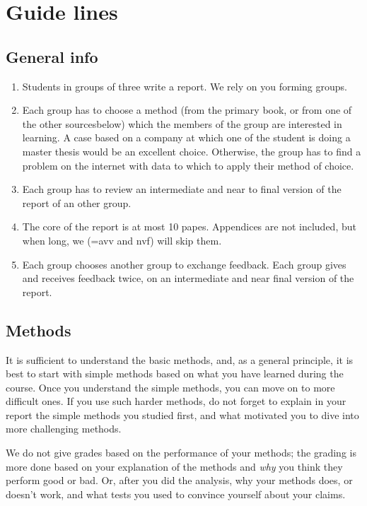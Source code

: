 \documentclass[report]{subfiles}
\begin{document}
\section*{Guide lines}
\label{sec:time-line}

\subsection*{General info}
\label{sec:general}


\begin{enumerate}
\item  Students in groups of three write a report. We rely on you forming groups.
\item Each group has to choose a method (from the primary book, or from one of the other sourcesbelow) which the members of the group are interested in learning. A case based on a company at which one of the student is doing a master thesis would be an excellent choice.
Otherwise, the group has to find a problem on the internet with data to which to apply their method of choice.
\item Each group has to review an intermediate and near to final version of the report of an other group.
\item The core of the report is at most 10 papes. Appendices are not included, but when long, we (=avv and nvf) will skip them.
\item Each group chooses another group to exchange feedback.
  Each group gives and receives feedback twice, on an intermediate and near final version of the report.
\end{enumerate}

\subsection{Methods}
\label{sec:methods}


It is sufficient to understand the basic methods, and, as a general principle, it is best to start with simple methods based on what you have learned during the course.
Once you understand the simple methods, you can move on to more difficult ones.
If you use such harder methods, do not forget to explain in your report the simple methods you studied first, and what motivated you to dive into more challenging methods.

We do not give grades based on the performance of your methods; the grading is more done based on your explanation of the methods and \emph{why} you think they perform good or bad. Or, after you did the analysis, why your methods does, or doesn't work, and what tests you used to convince yourself about your claims.
\end{document}
